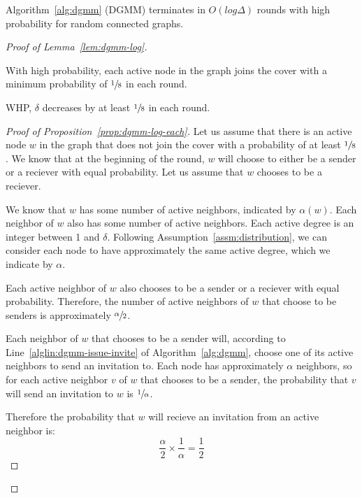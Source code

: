 \begin{lem}
\label{lem:dgmm-log}
Algorithm~\ref{alg:dgmm} (DGMM) terminates in $O(log \Delta)$ rounds with high probability for random connected graphs.
\end{lem}




\begin{proof}[Proof of Lemma~\ref{lem:dgmm-log}]
\begin{lprp}
\label{prop:dgmm-log-each}
With high probability, each active node in the graph joins the cover with a minimum probability of $\sfrac{1}{8}$ in each round.
\end{lprp}
\begin{lprp}
\label{prop:dgmm-log-alpha}
WHP, $\delta$ decreases by at least $\sfrac{1}{8}$ in each round.
\end{lprp}
\begin{proof}[Proof of Proposition~\ref{prop:dgmm-log-each}]
Let us assume that there is an active node $w$ in the graph that does not join the cover with a probability of at least $\sfrac{1}{8}$. We know that at the beginning of the round, $w$ will choose to either be a sender or a reciever with equal probability. Let us assume that $w$ chooses to be a reciever.

We know that $w$ has some number of active neighbors, indicated by $\alpha(w)$. Each neighbor of $w$ also has some number of active neighbors. Each active degree is an integer between 1 and $\delta$. Following Assumption~\ref{assm:distribution}, we can consider each node to have approximately the same active degree, which we indicate by $\alpha$. 

Each active neighbor of $w$ also chooses to be a sender or a reciever with equal probability. Therefore, the number of active neighbors of $w$ that choose to be senders is approximately $\sfrac{\alpha}{2}$. 

Each neighbor of $w$ that chooses to be a sender will, according to Line~\ref{alglin:dgmm-issue-invite} of Algorithm~\ref{alg:dgmm}, choose one of its active neighbors to send an invitation to. Each node has approximately $\alpha$ neighbors, so for each active neighbor $v$ of $w$ that chooses to be a sender, the probability that $v$ will send an invitation to $w$ is $\sfrac{1}{\alpha}$.

Therefore the probability that $w$ will recieve an invitation from an active neighbor is: \begin{equation*}\frac{\alpha}{2} \times \frac{1}{\alpha} = \frac{1}{2}\end{equation*}


\end{proof}
\end{proof}

